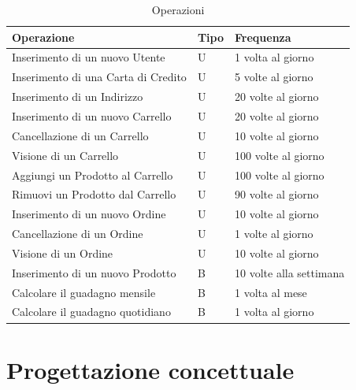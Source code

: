 \documentclass[11pt]{article}
\renewcommand{\labelitemi}{-}
\begin{document}
\begin{table}[H]
	\centering
	\begin{tabular}{|l|l|l|}
		\hline
		\textbf{Operazione} & \textbf{Tipo} & \textbf{Frequenza} \\
		\hline
		Inserimento di un nuovo Utente & U & 1 volta al giorno \\
		\hline
		Inserimento di una Carta di Credito & U & 5 volte al giorno \\
		\hline
		Inserimento di un Indirizzo & U & 20 volte al giorno \\
		\hline
		Inserimento di un nuovo Carrello & U & 20 volte al giorno \\
		\hline
		Cancellazione di un Carrello & U & 10 volte al giorno \\
		\hline
		Visione di un Carrello & U & 100 volte al giorno \\
		\hline
		Aggiungi un Prodotto al Carrello & U & 100 volte al giorno \\
		\hline
		Rimuovi un Prodotto dal Carrello & U & 90 volte al giorno \\
		\hline
		Inserimento di un nuovo Ordine & U & 10 volte al giorno \\
		\hline
		Cancellazione di un Ordine & U & 1 volte al giorno \\
		\hline
		Visione di un Ordine & U & 10 volte al giorno \\
		\hline
		Inserimento di un nuovo Prodotto & B & 10 volte alla settimana \\
		\hline
		Calcolare il guadagno mensile & B & 1 volta al mese \\
		\hline
		Calcolare il guadagno quotidiano & B & 1 volta al giorno \\
		\hline
	\end{tabular}
	\caption{Operazioni}
\end{table}

\section{Progettazione concettuale}

\renewcommand{\labelitemi}{\textbullet}
\end{document}
